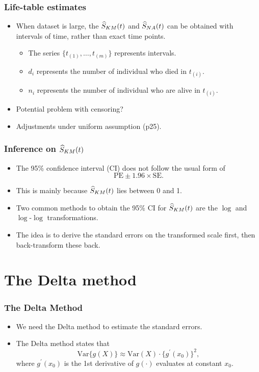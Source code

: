 \documentclass[10pt]{beamer}\usepackage[]{graphicx}\usepackage[]{color}
\newcommand{\Var}{\mathrm{Var}}
\newcommand{\Skm}{\widehat{S}_{\scriptsize{KM}}}
\newcommand{\Sna}{\widehat{S}_{\scriptsize{NA}}}
\begin{document}
\begin{frame}[fragile]
\begin{itemize}
\begin{center}
    \end{center}
  \end{itemize}
\end{frame}


\begin{frame}
  \frametitle{Life-table estimates}
  \begin{itemize}
  \item When dataset is large, the $\Skm(t)$ and $\Sna(t)$ can be obtained with intervals of time, 
    rather than exact time points.
    \begin{itemize}
    \item The series $\{t_{(1)}, \ldots, t_{(m)}\}$ represents intervals. 
    \item $d_i$ represents the number of individual who died in $t_{(i)}$.
    \item $n_i$ represents the number of individual who are alive in $t_{(i)}$.
    \end{itemize}
  \item Potential problem with censoring? 
  \item Adjustments under uniform assumption (p25).
\end{itemize}
\end{frame}

\begin{frame}
  \frametitle{Inference on $\Skm(t)$}
  \begin{itemize}
    \item The 95\% confidence interval (CI) does not follow the usual form of 
      $$\mbox{PE} \pm 1.96 \times\mbox{SE}.$$
    \item This is mainly because $\Skm(t)$ lies between 0 and 1. 
    \item Two common methods to obtain the 95\% CI for $\Skm(t)$ are the
      $\log$ and $\log$-$\log$ transformations.
    \item The idea is to derive the standard errors on the transformed scale first, 
      then back-transform these back.
  \end{itemize}
\end{frame}

\section{The Delta method}
\begin{frame}
  \frametitle{The Delta Method}
  \begin{itemize}
    \item We need the Delta method to estimate the standard errors.
    \item The Delta method states that
      $$ \Var\{g(X)\}\approx \Var(X) \cdot\{g^\prime(x_0)\}^2,$$
      where $g^\prime(x_0)$ is the 1st derivative of $g(\cdot)$ evaluates at constant $x_0$.
  \end{itemize}
\end{frame}
\end{document}
